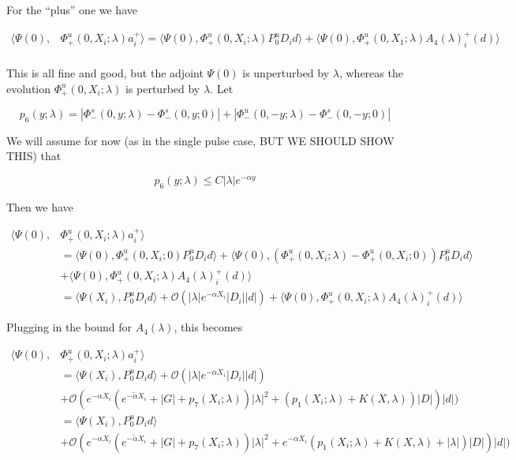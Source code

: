 \documentclass[12pt]{article}
\begin{document}
\begin{enumerate}
For the ``plus'' one we have

\begin{align*}
\langle \Psi(0), &\Phi^u_+(0, X_i; \lambda) a_i^+ \rangle = \langle \Psi(0), \Phi^u_+(0, X_i; \lambda) P^u_0 D_i d \rangle + \langle \Psi(0), \Phi^u_+(0, X_1; \lambda) A_4(\lambda)_i^+(d) \rangle \\
\end{align*} 

This is all fine and good, but the adjoint $\Psi(0)$ is unperturbed by $\lambda$, whereas the evolution $\Phi^u_+(0, X_i; \lambda)$ is perturbed by $\lambda$. Let

\[
p_6(y; \lambda) = |\Phi^s_-(0, y; \lambda) - \Phi^s_-(0, y; 0)| + |\Phi^u_-(0, -y; \lambda) - \Phi^s_-(0, -y; 0)| 
\]

We will assume for now (as in the single pulse case, BUT WE SHOULD SHOW THIS) that

\[
p_6(y; \lambda) \leq C |\lambda| e^{-\alpha y}
\]

Then we have

\begin{align*}
\langle \Psi(0), &\Phi^u_+(0, X_i; \lambda) a_i^+ \rangle \\
&= \langle \Psi(0), \Phi^u_+(0, X_i; 0) P^u_0 D_i d \rangle + \langle \Psi(0), (\Phi^u_+(0, X_i; \lambda) - \Phi^u_+(0, X_i; 0)) P^u_0 D_i d \rangle \\
&+ \langle \Psi(0), \Phi^u_+(0, X_i; \lambda) A_4(\lambda)_i^+(d) \rangle \\
&= \langle \Psi(X_i), P^u_0 D_i d \rangle + \mathcal{O}(|\lambda| e^{-\alpha X_i}|D_i||d|) + \langle \Psi(0), \Phi^u_+(0, X_i; \lambda) A_4(\lambda)_i^+(d) \rangle 
\end{align*}

Plugging in the bound for $A_4(\lambda)$, this becomes

\begin{align*}
\langle \Psi(0), &\Phi^u_+(0, X_i; \lambda) a_i^+ \rangle \\
&= \langle \Psi(X_i), P^u_0 D_i d \rangle  + \mathcal{O}(|\lambda| e^{-\alpha X_i}|D_i||d|) \\
&+ \mathcal{O}(e^{-\alpha X_i}(e^{-\tilde{\alpha} X_i} + |G| + p_7(X_i; \lambda))|\lambda|^2 + (p_1(X_i; \lambda) + K(X, \lambda) ) |D|)|d|) \\
&= \langle \Psi(X_i), P^u_0 D_i d \rangle \\
&+ \mathcal{O}(e^{-\alpha X_i}(e^{-\tilde{\alpha} X_i} + |G| + p_7(X_i; \lambda))|\lambda|^2 + e^{-\alpha X_i}(p_1(X_i; \lambda) + K(X, \lambda) + |\lambda|) |D|)|d|)
\end{align*}


\end{enumerate}
\end{document}

